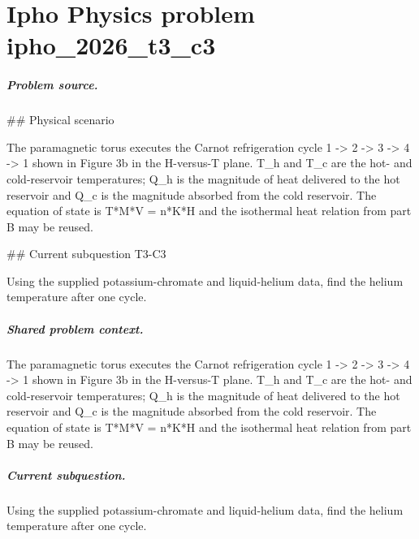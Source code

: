 
\chapter{Ipho Physics problem ipho\_2026\_t3\_c3}
\label{ch:IPhO2026Problems_problem_ipho_2026_t3_c3}

\paragraph{Problem source.}
\#\# Physical scenario

The paramagnetic torus executes the Carnot refrigeration cycle
1 -> 2 -> 3 -> 4 -> 1 shown in Figure 3b in the H-versus-T plane.  T\_h and T\_c
are the hot- and cold-reservoir temperatures; Q\_h is the magnitude of heat
delivered to the hot reservoir and Q\_c is the magnitude absorbed from the cold
reservoir.  The equation of state is T*M*V = n*K*H and the isothermal heat
relation from part B may be reused.

\#\# Current subquestion T3-C3

Using the supplied potassium-chromate and liquid-helium data, find the helium temperature after one cycle.

\paragraph{Shared problem context.}
The paramagnetic torus executes the Carnot refrigeration cycle
1 -> 2 -> 3 -> 4 -> 1 shown in Figure 3b in the H-versus-T plane.  T\_h and T\_c
are the hot- and cold-reservoir temperatures; Q\_h is the magnitude of heat
delivered to the hot reservoir and Q\_c is the magnitude absorbed from the cold
reservoir.  The equation of state is T*M*V = n*K*H and the isothermal heat
relation from part B may be reused.

\paragraph{Current subquestion.}
Using the supplied potassium-chromate and liquid-helium data, find the helium temperature after one cycle.


